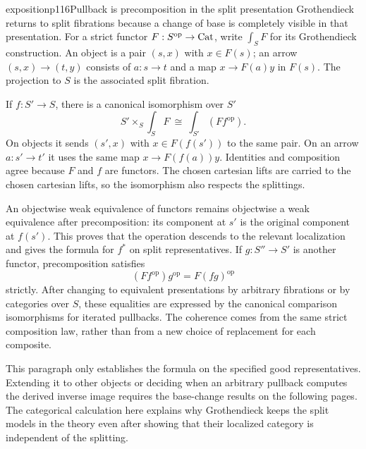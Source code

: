 \begin{dcomment}{exposition}{p116}{Pullback is precomposition in the split presentation}
Grothendieck returns to split fibrations because a change of base is completely visible in that presentation. For a strict functor $F:S^{\mathrm{op}}\to\mathrm{Cat}$, write $\int_SF$ for its Grothendieck construction. An object is a pair $(s,x)$ with $x\in F(s)$; an arrow $(s,x)\to(t,y)$ consists of $a:s\to t$ and a map $x\to F(a)y$ in $F(s)$. The projection to $S$ is the associated split fibration.

If $f:S'\to S$, there is a canonical isomorphism over $S'$
\[
 S'\times_S\int_SF\ \cong\ \int_{S'}(Ff^{\mathrm{op}}).
\]
On objects it sends $(s',x)$ with $x\in F(f(s'))$ to the same pair. On an arrow $a:s'\to t'$ it uses the same map $x\to F(f(a))y$. Identities and composition agree because $F$ and $f$ are functors. The chosen cartesian lifts are carried to the chosen cartesian lifts, so the isomorphism also respects the splittings.

An objectwise weak equivalence of functors remains objectwise a weak equivalence after precomposition: its component at $s'$ is the original component at $f(s')$. This proves that the operation descends to the relevant localization and gives the formula for $f^*$ on split representatives. If $g:S''\to S'$ is another functor, precomposition satisfies
\[
 (Ff^{\mathrm{op}})g^{\mathrm{op}}
   =F(fg)^{\mathrm{op}}
\]
strictly. After changing to equivalent presentations by arbitrary fibrations or by categories over $S$, these equalities are expressed by the canonical comparison isomorphisms for iterated pullbacks. The coherence comes from the same strict composition law, rather than from a new choice of replacement for each composite.

This paragraph only establishes the formula on the specified good representatives. Extending it to other objects or deciding when an arbitrary pullback computes the derived inverse image requires the base-change results on the following pages. The categorical calculation here explains why Grothendieck keeps the split models in the theory even after showing that their localized category is independent of the splitting.
\end{dcomment}


